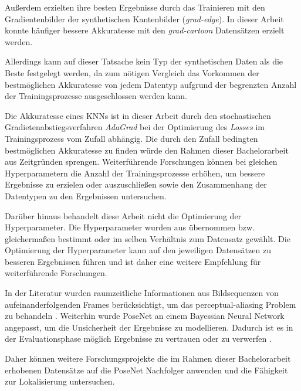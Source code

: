 Außerdem erzielten \citet{acharyaBIMPoseNetIndoorCamera2019} ihre besten Ergebnisse durch das Trainieren mit den Gradientenbilder der synthetischen Kantenbilder (\textit{grad-edge}). In dieser Arbeit konnte häufiger bessere Akkuratesse  mit den \textit{grad-cartoon} Datensätzen erzielt werden. 




Allerdings kann auf dieser Tatsache kein Typ der synthetischen Daten als die Beste festgelegt werden, da zum nötigen Vergleich das Vorkommen der bestmöglichen Akkuratesse von jedem Datentyp aufgrund der begrenzten Anzahl der Trainingsprozesse ausgeschlossen werden kann. 
 










Die Akkuratesse eines KNNs ist in dieser Arbeit durch den stochastischen Gradietenabstiegsverfahren \textit{AdaGrad} bei der Optimierung des \textit{Losses} im Trainingsprozess vom Zufall abhängig. Die durch den Zufall bedingten bestmöglichen Akkuratesse zu finden würde den Rahmen dieser Bachelorarbeit aus Zeitgründen sprengen. Weiterführende Forschungen können bei gleichen Hyperparametern die Anzahl der Trainingsprozesse erhöhen, um bessere Ergebnisse zu erzielen oder auszuschließen sowie den Zusammenhang der Datentypen zu den Ergebnissen untersuchen. 


Darüber hinaus behandelt diese Arbeit nicht die Optimierung der Hyperparameter. Die Hyperparameter wurden aus \citet{acharyaBIMPoseNetIndoorCamera2019} übernommen bzw. gleichermaßen bestimmt oder im selben Verhältnis zum Datensatz gewählt. Die Optimierung der Hyperparameter kann auf den jeweiligen Datensätzen zu besseren Ergebnissen führen und ist daher eine weitere Empfehlung für weiterführende Forschungen. 

In der Literatur wurden raumzeitliche Informationen aus Bildsequenzen von aufeinanderfolgenden Frames berücksichtigt, um das perceptual-aliasing Problem zu behandeln \cite{walchImageBasedLocalizationUsing2017, clarkVidLocDeepSpatioTemporal2017}. Weiterhin wurde PoseNet an einem Bayessian Neural Network angepasst, um die Unsicherheit der Ergebnisse zu modellieren. Dadurch ist es in der Evaluationsphase möglich Ergebnisse zu vertrauen oder zu verwerfen \cite{kendallModellingUncertaintyDeep2016}. 


Daher können weitere Forschungsprojekte die im Rahmen dieser Bachelorarbeit erhobenen Datensätze auf die PoseNet Nachfolger \cite{kendallModellingUncertaintyDeep2016, walchImageBasedLocalizationUsing2017, clarkVidLocDeepSpatioTemporal2017} anwenden und die Fähigkeit zur Lokalisierung untersuchen.